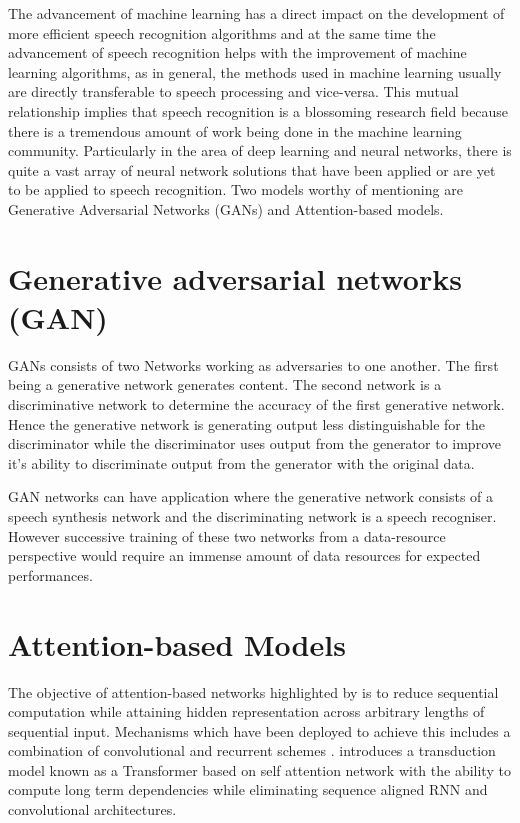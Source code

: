 The advancement of machine learning has a direct impact on the development of more efficient speech recognition algorithms and at the same time the advancement of speech recognition helps with the improvement of machine learning algorithms, as in general, the methods used in machine learning usually are directly transferable to speech processing and vice-versa.  This mutual relationship implies that speech recognition is a blossoming research field because there is a tremendous amount of work being done in the machine learning community.   Particularly in the area of deep learning and neural networks, there is quite a vast array of neural network solutions that have been applied or are yet to be applied to speech recognition.  Two models worthy of mentioning are Generative Adversarial Networks (GANs) and Attention-based models. 


\section{Generative adversarial networks (GAN)}

GANs consists of two Networks working as adversaries to one another.  The first being a generative network generates content.  The second network is a discriminative network to determine the accuracy of the first generative network.  Hence the generative network is generating output less distinguishable for the discriminator while the discriminator uses output from the generator to improve it’s ability to discriminate output from the generator with the original data.

GAN networks can have application where the generative network consists of a speech synthesis network and the discriminating network is  a speech recogniser.  However successive training of these two networks from a data-resource perspective would require an immense amount of data resources for expected performances. 

\section{Attention-based Models}

The objective of attention-based networks highlighted by  \cite{vaswani2017attention} is to reduce sequential computation while attaining hidden representation across arbitrary lengths of sequential input. Mechanisms which have been deployed to achieve this includes a combination of convolutional and recurrent schemes \cite{kaiser2016can,kalchbrenner2016neural, gehring2017convolutional}. \cite{vaswani2017attention} introduces a transduction model known as a Transformer based on self attention network with the ability to compute long term dependencies while eliminating sequence aligned RNN and convolutional architectures.

